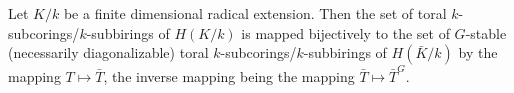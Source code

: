 Let $K/k$ be a finite dimensional radical extension. Then the set of toral $k$-subcorings/$k$-subbirings of $H(K/k)$ is mapped bijectively to the set of $G$-stable (necessarily diagonalizable) toral $k$-subcorings/$k$-subbirings of $H(\bar{K}/k)$ by the mapping $T \mapsto \bar{T}$, the inverse mapping being the mapping $\bar{T} \mapsto \bar{T}^G$.
